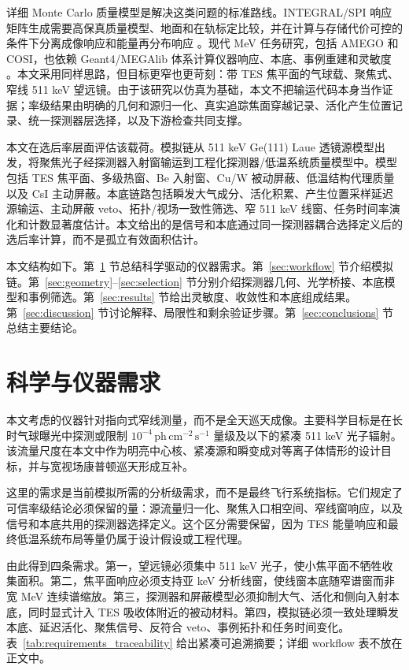 \documentclass[preprint,12pt]{elsarticle}
\newcommand{\phcms}{\,\mathrm{ph\,cm^{-2}\,s^{-1}}}
\begin{document}
详细 Monte Carlo 质量模型是解决这类问题的标准路线。INTEGRAL/\allowbreak SPI 响应矩阵生成需要高保真质量模型、地面和在轨标定比较，并在计算与存储代价可控的条件下分离成像响应和能量再分布响应 \cite{Sturner2003}。现代 MeV 任务研究，包括 AMEGO 和 COSI，也依赖 Geant4/MEGAlib 体系计算仪器响应、本底、事例重建和灵敏度 \cite{Agostinelli2003,Allison2016,Zoglauer2006,Caputo2017,Karwin2023,Gallego2025Balloon,Gallego2025,Beechert2022,Sleator2019,Ciabattoni2025ACS}。本文采用同样思路，但目标更窄也更苛刻：带 TES 焦平面的气球载、聚焦式、窄线 511 keV 望远镜。由于该研究以仿真为基础，本文不把输运代码本身当作证据；率级结果由明确的几何和源归一化、真实追踪焦面穿越记录、活化产生位置记录、统一探测器层选择，以及下游检查共同支撑。

本文在选后率层面评估该载荷。模拟链从 511 keV Ge(111) Laue 透镜源模型出发，将聚焦光子经探测器入射窗输运到工程化探测器/低温系统质量模型中。模型包括 TES 焦平面、多级热窗、Be 入射窗、Cu/W 被动屏蔽、低温结构代理质量以及 CsI 主动屏蔽。本底链路包括瞬发大气成分、活化积累、产生位置采样延迟源输运、主动屏蔽 veto、拓扑/视场一致性筛选、窄 511 keV 线窗、任务时间率演化和计数显著度估计。本文给出的是信号和本底通过同一探测器耦合选择定义后的选后率计算，而不是孤立有效面积估计。

本文结构如下。第~\ref{sec:requirements} 节总结科学驱动的仪器需求。第~\ref{sec:workflow} 节介绍模拟链。第~\ref{sec:geometry}--\ref{sec:selection} 节分别介绍探测器几何、光学桥接、本底模型和事例筛选。第~\ref{sec:results} 节给出灵敏度、收敛性和本底组成结果。第~\ref{sec:discussion} 节讨论解释、局限性和剩余验证步骤。第~\ref{sec:conclusions} 节总结主要结论。

\section{科学与仪器需求}
\label{sec:requirements}

本文考虑的仪器针对指向式窄线测量，而不是全天巡天成像。主要科学目标是在长时气球曝光中探测或限制 $10^{-4}\phcms$ 量级及以下的紧凑 511 keV 光子辐射。该流量尺度在本文中作为明亮中心核、紧凑源和瞬变成对等离子体情形的设计目标，并与宽视场康普顿巡天形成互补。

这里的需求是当前模拟所需的分析级需求，而不是最终飞行系统指标。它们规定了可信率级结论必须保留的量：源流量归一化、聚焦入口相空间、窄线窗响应，以及信号和本底共用的探测器选择定义。这个区分需要保留，因为 TES 能量响应和最终低温系统布局等量仍属于设计假设或工程代理。

由此得到四条需求。第一，望远镜必须集中 511 keV 光子，使小焦平面不牺牲收集面积。第二，焦平面响应必须支持亚 keV 分析线窗，使线窗本底随窄谱窗而非宽 MeV 连续谱缩放。第三，探测器和屏蔽模型必须抑制大气、活化和侧向入射本底，同时显式计入 TES 吸收体附近的被动材料。第四，模拟链必须一致处理瞬发本底、延迟活化、聚焦信号、反符合 veto、事例拓扑和任务时间变化。表~\ref{tab:requirements_traceability} 给出紧凑可追溯摘要；详细 workflow 表不放在正文中。
\end{document}
